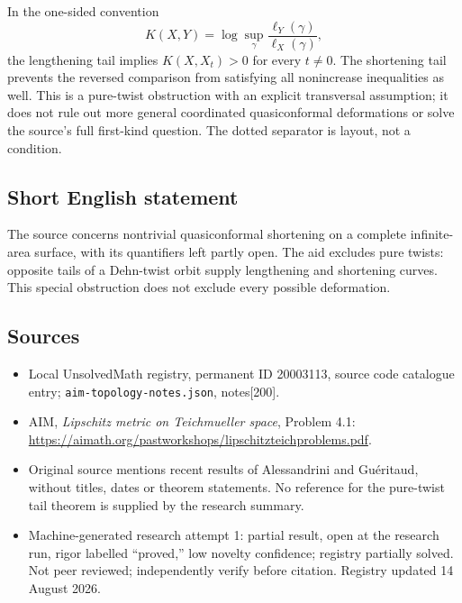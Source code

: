 \documentclass[11pt]{article}
\begin{document}
In the one-sided convention
\[
 K(X,Y)=\log\sup_{\gamma}
 \frac{\ell_Y(\gamma)}{\ell_X(\gamma)},
\]
the lengthening tail implies $K(X,X_t)>0$ for every $t\ne0$. The shortening tail prevents the reversed comparison from satisfying all nonincrease inequalities as well. This is a pure-twist obstruction with an explicit transversal assumption; it does not rule out more general coordinated quasiconformal deformations or solve the source's full first-kind question. The dotted separator is layout, not a condition.
\subsection{Short English statement}
The source concerns nontrivial quasiconformal shortening on a complete infinite-area surface, with its quantifiers left partly open. The aid excludes pure twists: opposite tails of a Dehn-twist orbit supply lengthening and shortening curves. This special obstruction does not exclude every possible deformation.
\subsection{Sources}
\begin{itemize}
\item Local UnsolvedMath registry, permanent ID 20003113, source code catalogue entry; \texttt{aim-topology-notes.json}, notes[200].
\item AIM, \emph{Lipschitz metric on Teichmueller space}, Problem 4.1: \url{https://aimath.org/pastworkshops/lipschitzteichproblems.pdf}.
\item Original source mentions recent results of Alessandrini and Gu\'eritaud, without titles, dates or theorem statements. No reference for the pure-twist tail theorem is supplied by the research summary.
\item Machine-generated research attempt 1: partial result, open at the research run, rigor labelled ``proved,'' low novelty confidence; registry partially solved. Not peer reviewed; independently verify before citation. Registry updated 14 August 2026.
\end{itemize}
\end{document}

